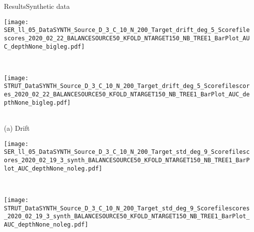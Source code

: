 \begin{frame}{Results}{Synthetic data}

\centering

    \renewcommand{\ratio}{0.9}
        \begin{minipage}[t]{0.33\linewidth}\vspace{0pt}
            \centering
            \begin{minipage}[t]{\ratio\linewidth}\vspace{0pt}
            \centerline{\texttt{[image: SER\_ll\_05\_DataSYNTH\_Source\_D\_3\_C\_10\_N\_200\_Target\_drift\_deg\_5\_Scorefilescores\_2020\_02\_22\_BALANCESOURCE50\_KFOLD\_NTARGET150\_NB\_TREE1\_BarPlot\_AUC\_depthNone\_bigleg.pdf]}}
            \end{minipage}\\
            \begin{minipage}[t]{\ratio\linewidth}\vspace{0cm}
            \centerline{\texttt{[image: STRUT\_DataSYNTH\_Source\_D\_3\_C\_10\_N\_200\_Target\_drift\_deg\_5\_Scorefilescores\_2020\_02\_22\_BALANCESOURCE50\_KFOLD\_NTARGET150\_NB\_TREE1\_BarPlot\_AUC\_depthNone\_bigleg.pdf]}}
            \end{minipage}\\
            \medskip
            {\small(a)\; Drift}
        \end{minipage}
        \begin{minipage}[t]{0.33\linewidth}\vspace{0pt}
            \centering
            \begin{minipage}[t]{\ratio\linewidth}\vspace{0pt}
            \centerline{\texttt{[image: SER\_ll\_05\_DataSYNTH\_Source\_D\_3\_C\_10\_N\_200\_Target\_std\_deg\_9\_Scorefilescores\_2020\_02\_19\_3\_synth\_BALANCESOURCE50\_KFOLD\_NTARGET150\_NB\_TREE1\_BarPlot\_AUC\_depthNone\_noleg.pdf]}}
            \end{minipage}\\
            \begin{minipage}[t]{\ratio\linewidth}\vspace{0cm}
            \centerline{\texttt{[image: STRUT\_DataSYNTH\_Source\_D\_3\_C\_10\_N\_200\_Target\_std\_deg\_9\_Scorefilescores\_2020\_02\_19\_3\_synth\_BALANCESOURCE50\_KFOLD\_NTARGET150\_NB\_TREE1\_BarPlot\_AUC\_depthNone\_noleg.pdf]}}
            \end{minipage}\\

\end{minipage}
\end{frame}
